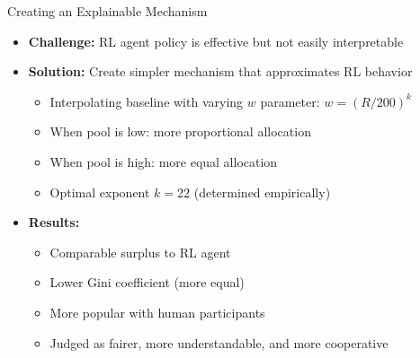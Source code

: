 \documentclass[aspectratio=169]{beamer} %
\begin{document}
\begin{frame}{Creating an Explainable Mechanism}
\begin{itemize}
    \item \textbf{Challenge:} RL agent policy is effective but not easily interpretable
    
    \item \textbf{Solution:} Create simpler mechanism that approximates RL behavior
    \begin{itemize}
        \item Interpolating baseline with varying $w$ parameter: $w = (R/200)^k$
        \item When pool is low: more proportional allocation
        \item When pool is high: more equal allocation
        \item Optimal exponent $k = 22$ (determined empirically)
    \end{itemize}
    
    \item \textbf{Results:}
    \begin{itemize}
        \item Comparable surplus to RL agent
        \item Lower Gini coefficient (more equal)
        \item More popular with human participants
        \item Judged as fairer, more understandable, and more cooperative
    \end{itemize}
\end{itemize}
\end{frame}
\end{document}
